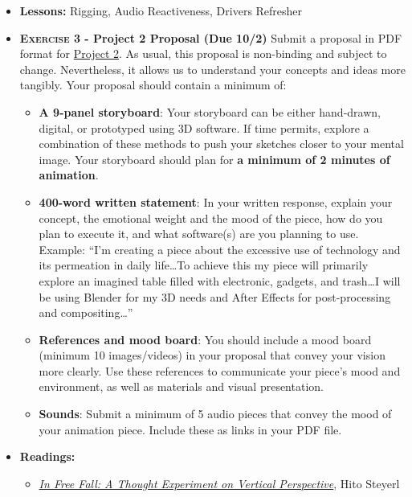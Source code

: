 \def\tues{9/29}%
\def\thur{10/1}%
\def\fri{10/2}%
% 
\begin{itemize}[noitemsep,topsep=0pt,leftmargin=*]
    \item \textbf{Lessons:} Rigging, Audio Reactiveness, Drivers Refresher
    \item \textbf{\textsc{Exercise 3} - Project 2 Proposal (Due \fri)} Submit a proposal in PDF format for \hyperlink{project2}{Project 2}. As usual, this proposal is non-binding and subject to change. Nevertheless, it allows us to understand your concepts and ideas more tangibly. Your proposal should contain a minimum of:
          \begin{itemize}
              \item \textbf{A 9-panel storyboard}: Your storyboard can be either hand-drawn, digital, or prototyped using 3D software. If time permits, explore a combination of these methods to push your sketches closer to your mental image. Your storyboard should plan for \textbf{a minimum of 2 minutes of animation}.
              \item \textbf{400-word written statement}: In your written response, explain your concept, the emotional weight and the mood of the piece, how do you plan to execute it, and what software(s) are you planning to use. \newline
                    Example: ``I'm creating a piece about the excessive use of technology and its permeation in daily life\dots To achieve this my piece will primarily explore an imagined table filled with electronic, gadgets, and trash\dots I will be using Blender for my 3D needs and After Effects for post-processing and compositing\dots''
              \item \textbf{References and mood board}: You should include a mood board (minimum 10 images/videos) in your proposal that convey your vision more clearly. Use these references to communicate your piece's mood and environment, as well as materials and visual presentation.
              \item \textbf{Sounds}: Submit a minimum of 5 audio pieces that convey the mood of your animation piece. Include these as links in your PDF file.
          \end{itemize}
    \item \textbf{Readings:}
          \begin{itemize}
              \item \href{https://www.e-flux.com/journal/24/67860/in-free-fall-a-thought-experiment-on-vertical-perspective/}{\emph{In Free Fall: A Thought Experiment on Vertical Perspective}}, Hito Steyerl

\end{itemize}
\end{itemize}
